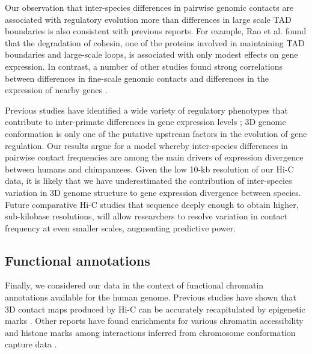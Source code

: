 Our observation that inter-species differences in pairwise genomic contacts are associated with regulatory evolution more than differences in large scale TAD boundaries is also consistent with previous reports. For example, Rao et al. \cite{Rao.2017} found that the degradation of cohesin, one of the proteins involved in maintaining TAD boundaries and large-scale loops, is associated with only modest effects on gene expression. In contrast, a number of other studies found strong correlations between differences in fine-scale genomic contacts and differences in the expression of nearby genes \cite{Rao.2014, Kagey.2010}.

Previous studies have identified a wide variety of regulatory phenotypes that contribute to inter-primate differences in gene expression levels \cite{Warner.2009, Loisel.2006, Pollard.2006, Pai.2011, Zhou.2014, Blekhman.2009, Cain.2011}; 3D genome conformation is only one of the putative upstream factors in the evolution of gene regulation. Our results argue for a model whereby inter-species differences in pairwise contact frequencies are among the main drivers of expression divergence between humans and chimpanzees. Given the low 10-kb resolution of our Hi-C data, it is likely that we have underestimated the contribution of inter-species variation in 3D genome structure to gene expression divergence between species. Future comparative Hi-C studies that sequence deeply enough to obtain higher, sub-kilobase resolutions, will allow researchers to resolve variation in contact frequency at even smaller scales, augmenting predictive power.

\subsection{Functional annotations}

Finally, we considered our data in the context of functional chromatin annotations available for the human genome. Previous studies have shown that 3D contact maps produced by Hi-C can be accurately recapitulated by epigenetic marks \cite{Pierro.2017, Zhu.2016}. Other reports have found enrichments for various chromatin accessibility and histone marks among interactions inferred from chromosome conformation capture data \cite{Roy.2015, Ron.2017}.

